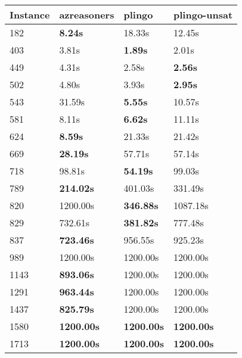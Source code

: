 \begin{tabular}{|l|l|l|l|}
\toprule
\textbf{Instance} & \textbf{azreasoners} &   \textbf{plingo} & \textbf{plingo-unsat} \\
\midrule
              182 &       \textbf{8.24s} &            18.33s &                12.45s \\
              403 &                3.81s &    \textbf{1.89s} &                 2.01s \\
              449 &                4.31s &             2.58s &        \textbf{2.56s} \\
              502 &                4.80s &             3.93s &        \textbf{2.95s} \\
              543 &               31.59s &    \textbf{5.55s} &                10.57s \\
              581 &                8.11s &    \textbf{6.62s} &                11.11s \\
              624 &       \textbf{8.59s} &            21.33s &                21.42s \\
              669 &      \textbf{28.19s} &            57.71s &                57.14s \\
              718 &               98.81s &   \textbf{54.19s} &                99.03s \\
              789 &     \textbf{214.02s} &           401.03s &               331.49s \\
              820 &             1200.00s &  \textbf{346.88s} &              1087.18s \\
              829 &              732.61s &  \textbf{381.82s} &               777.48s \\
              837 &     \textbf{723.46s} &           956.55s &               925.23s \\
              989 &             1200.00s &          1200.00s &              1200.00s \\
             1143 &     \textbf{893.06s} &          1200.00s &              1200.00s \\
             1291 &     \textbf{963.44s} &          1200.00s &              1200.00s \\
             1437 &     \textbf{825.79s} &          1200.00s &              1200.00s \\
             1580 &    \textbf{1200.00s} & \textbf{1200.00s} &     \textbf{1200.00s} \\
             1713 &    \textbf{1200.00s} & \textbf{1200.00s} &     \textbf{1200.00s} \\

\end{tabular}
